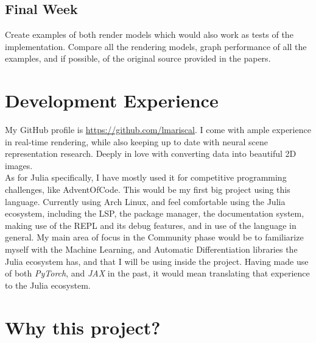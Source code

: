 \subsection*{Final Week}

Create examples of both render models which would also work as tests of the implementation. Compare all the rendering models, graph performance of all the examples, and if possible, of the original source provided in the papers.

\section*{Development Experience}

My GitHub profile is \url{https://github.com/lmariscal}. I come with ample experience in real-time rendering, while also keeping up to date with neural scene representation research. Deeply in love with converting data into beautiful 2D images.\\
As for Julia specifically, I have mostly used it for competitive programming challenges, like AdventOfCode. This would be my first big project using this language. Currently using Arch Linux, and feel comfortable using the Julia ecosystem, including the LSP, the package manager, the documentation system, making use of the REPL and its debug features, and in use of the language in general. My main area of focus in the Community phase would be to familiarize myself with the Machine Learning, and Automatic Differentiation libraries the Julia ecosystem has, and that I will be using inside the project. Having made use of both \textit{PyTorch}, and \textit{JAX} in the past, it would mean translating that experience to the Julia ecosystem.


\section*{Why this project?}

